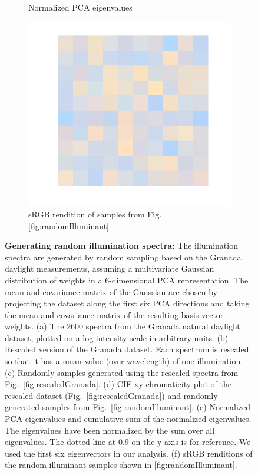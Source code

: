 \documentclass{jov}
\begin{document}
\begin{figure}
\begin{subfigure}[b]{0.3 \textwidth}
        \caption{Normalized PCA eigenvalues}
        \label{fig:granadaEV}
    \end{subfigure}
      	\begin{subfigure}[b]{0.3 \textwidth}
    \centering
        \includegraphics[width=\textwidth]{../Figures/Figure6/Figure6_f.pdf}
        \caption{sRGB rendition of samples from Fig.\ref{fig:randomIlluminant}}
        \label{fig:sRGBIlluminant}
    \end{subfigure}
    \caption{{\bf Generating random illumination spectra:} The illumination spectra are generated by random sampling based on the Granada daylight measurements, assuming a multivariate Gaussian distribution of weights in a 6-dimensional PCA representation. The mean and covariance matrix of the Gaussian are chosen by projecting the dataset along the first six PCA directions and taking the mean and covariance matrix of the resulting basis vector weights. (a) The 2600 spectra from the Granada natural daylight dataset, plotted on a log intensity scale in arbitrary units. (b) Rescaled version of the Granada dataset. Each spectrum is rescaled so that it has a mean value (over wavelength) of one illumination. (c) Randomly samples generated using the rescaled spectra from Fig.~\ref{fig:rescaledGranada}. (d) CIE xy chromaticity plot of the rescaled dataset (Fig.~\ref{fig:rescaledGranada}) and randomly generated samples from Fig.~\ref{fig:randomIlluminant}. (e) Normalized PCA eigenvalues and cumulative sum of the normalized eigenvalues. The eigenvalues have been normalized by the sum over all eigenvalues. The dotted line at 0.9 on the y-axis is for reference. We used the first six eigenvectors in our analysis. (f) sRGB renditions of the random illuminant samples shown in \ref{fig:randomIlluminant}.}\label{fig:illluminationGeneration}
\end{figure}
\end{document}
